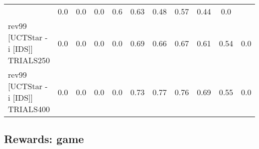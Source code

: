 \documentclass{article}
\begin{document}
\begin{tabular}{|l|r@{$\pm$}rr@{$\pm$}rr@{$\pm$}rr@{$\pm$}rr@{$\pm$}rr@{$\pm$}rr@{$\pm$}rr@{$\pm$}rr@{$\pm$}rr@{$\pm$}r|}
& \multicolumn{2}{c}{0.0}
& \multicolumn{2}{c}{0.0}
& \multicolumn{2}{c}{0.0}
& \multicolumn{2}{c}{0.6}
& \multicolumn{2}{c}{0.63}
& \multicolumn{2}{c}{0.48}
& \multicolumn{2}{c}{0.57}
& \multicolumn{2}{c}{0.44}
& \multicolumn{2}{c|}{0.0}
\\
rev99 [UCTStar -i [IDS]] TRIALS250
& \multicolumn{2}{c}{0.0}
& \multicolumn{2}{c}{0.0}
& \multicolumn{2}{c}{0.0}
& \multicolumn{2}{c}{0.0}
& \multicolumn{2}{c}{0.69}
& \multicolumn{2}{c}{0.66}
& \multicolumn{2}{c}{0.67}
& \multicolumn{2}{c}{0.61}
& \multicolumn{2}{c}{0.54}
& \multicolumn{2}{c|}{0.0}
\\
rev99 [UCTStar -i [IDS]] TRIALS400
& \multicolumn{2}{c}{0.0}
& \multicolumn{2}{c}{0.0}
& \multicolumn{2}{c}{0.0}
& \multicolumn{2}{c}{0.0}
& \multicolumn{2}{c}{0.73}
& \multicolumn{2}{c}{0.77}
& \multicolumn{2}{c}{0.76}
& \multicolumn{2}{c}{0.69}
& \multicolumn{2}{c}{0.55}
& \multicolumn{2}{c|}{0.0}
\\
\hline
\end{tabular}%

\bigskip

\subsection*{Rewards: game}
\end{document}
